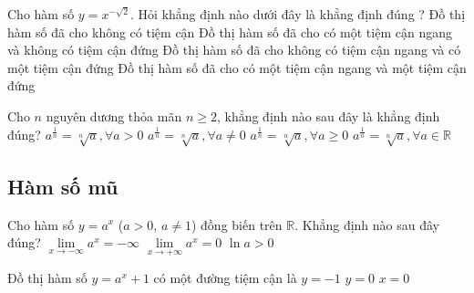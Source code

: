 \begin{ex}%
	Cho hàm số $y=x^{-\sqrt{2}}$. Hỏi khẳng định nào dưới đây là khẳng định đúng ?
	\choice
	{Đồ thị hàm số đã cho không có tiệm cận}
	{Đồ thị hàm số đã cho có một tiệm cận ngang và không có tiệm cận đứng}
	{Đồ thị hàm số đã cho không có tiệm cận ngang và có một tiệm cận đứng}
	{\True Đồ thị hàm số đã cho có một tiệm cận ngang và một tiệm cận đứng}
\end{ex}

\begin{ex}%
	Cho $n$ nguyên dương thỏa mãn $n\geq 2$, khẳng định nào sau đây là khẳng định đúng?
	\choice
	{\True $a^{\frac{1}{n}}=\sqrt[n]{a}, \forall a>0$}
	{$a^{\frac{1}{n}}=\sqrt[n]{a}, \forall a\neq 0$}
	{$a^{\frac{1}{n}}=\sqrt[n]{a}, \forall a\geq 0$}
	{$a^{\frac{1}{n}}=\sqrt[n]{a}, \forall a\in \mathbb{R}$}
\end{ex}

\subsection{Hàm số mũ}
\begin{ex}%
	Cho hàm số $y=a^x$ ($a>0$, $a\neq 1$) đồng biến trên $\mathbb{R}$. Khẳng định nào sau đây đúng?
	{$\lim\limits_{x\rightarrow -\infty} a^x=-\infty$}
	{$\lim\limits_{x\rightarrow +\infty} a^x=0$}
	{\True $\ln a>0$}
\end{ex}

\begin{ex}%
	Đồ thị hàm số $y=a^x+1$ có một đường tiệm cận là
	{$y=-1$}
	{$y=0$}
	{$x=0$}
\end{ex}


